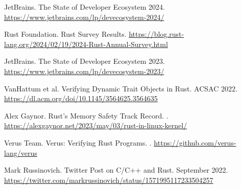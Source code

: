 \documentclass[11pt]{article}
\begin{document}
\begin{thebibliography}{99}
JetBrains.
\newblock The State of Developer Ecosystem 2024.
\newblock \url{https://www.jetbrains.com/lp/devecosystem-2024/}

Rust Foundation.
 Rust Survey Results.
\newblock \url{https://blog.rust-lang.org/2024/02/19/2024-Rust-Annual-Survey.html}

JetBrains.
\newblock The State of Developer Ecosystem 2023.
\newblock \url{https://www.jetbrains.com/lp/devecosystem-2023/}

VanHattum et al.
\newblock Verifying Dynamic Trait Objects in Rust.
\newblock ACSAC 2022.
\newblock \url{https://dl.acm.org/doi/10.1145/3564625.3564635}

Alex Gaynor.
\newblock Rust's Memory Safety Track Record.
.
\newblock \url{https://alexgaynor.net/2023/may/03/rust-in-linux-kernel/}

Verus Team.
\newblock Verus: Verifying Rust Programs.
.
\newblock \url{https://github.com/verus-lang/verus}

Mark Russinovich.
\newblock Twitter Post on C/C++ and Rust.
\newblock September 2022.
\newblock \url{https://twitter.com/markrussinovich/status/1571995117233504257}

\end{thebibliography}
\end{document}

